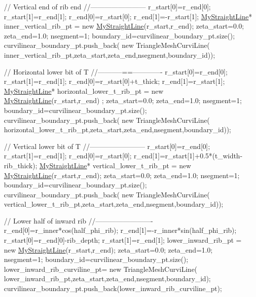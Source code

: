 \begin{DoxyCodeInclude}
  \textcolor{comment}{// Vertical end of rib end}
  \textcolor{comment}{//------------------------}
  r\_start[0]=r\_end[0];
  r\_start[1]=r\_end[1];
  r\_end[0]=r\_start[0];
  r\_end[1]=-r\_start[1];
  \hyperlink{classMyStraightLine}{MyStraightLine}* inner\_vertical\_rib\_pt = \textcolor{keyword}{new} \hyperlink{classMyStraightLine}{MyStraightLine}(r\_start,r\_end);
  zeta\_start=0.0;
  zeta\_end=1.0;
  nsegment=1;
  boundary\_id=curvilinear\_boundary\_pt.size();
  curvilinear\_boundary\_pt.push\_back(
   \textcolor{keyword}{new} TriangleMeshCurviLine(
    inner\_vertical\_rib\_pt,zeta\_start,zeta\_end,nsegment,boundary\_id));
 

  \textcolor{comment}{// Horizontal lower bit of T}
  \textcolor{comment}{//-----------==-------------}
  r\_start[0]=r\_end[0];
  r\_start[1]=r\_end[1];
  r\_end[0]=r\_start[0]+t\_thick;
  r\_end[1]=r\_start[1];
  \hyperlink{classMyStraightLine}{MyStraightLine}* horizontal\_lower\_t\_rib\_pt = \textcolor{keyword}{new} \hyperlink{classMyStraightLine}{MyStraightLine}(r\_start,r\_end)
      ;
  zeta\_start=0.0;
  zeta\_end=1.0;
  nsegment=1;
  boundary\_id=curvilinear\_boundary\_pt.size();
  curvilinear\_boundary\_pt.push\_back(
   \textcolor{keyword}{new} TriangleMeshCurviLine(
    horizontal\_lower\_t\_rib\_pt,zeta\_start,zeta\_end,nsegment,boundary\_id));


  \textcolor{comment}{// Vertical lower bit of T}
  \textcolor{comment}{//------------------------}
  r\_start[0]=r\_end[0];
  r\_start[1]=r\_end[1];
  r\_end[0]=r\_start[0];
  r\_end[1]=r\_start[1]+0.5*(t\_width-rib\_thick);
  \hyperlink{classMyStraightLine}{MyStraightLine}* vertical\_lower\_t\_rib\_pt = \textcolor{keyword}{new} \hyperlink{classMyStraightLine}{MyStraightLine}(r\_start,r\_end);
  zeta\_start=0.0;
  zeta\_end=1.0;
  nsegment=1;
  boundary\_id=curvilinear\_boundary\_pt.size();
  curvilinear\_boundary\_pt.push\_back(
   \textcolor{keyword}{new} TriangleMeshCurviLine(
    vertical\_lower\_t\_rib\_pt,zeta\_start,zeta\_end,nsegment,boundary\_id));


  \textcolor{comment}{// Lower half of inward rib}
  \textcolor{comment}{//-------------------------}
  r\_end[0]=r\_inner*cos(half\_phi\_rib);
  r\_end[1]=-r\_inner*sin(half\_phi\_rib);
  r\_start[0]=r\_end[0]-rib\_depth;
  r\_start[1]=r\_end[1];
  lower\_inward\_rib\_pt = \textcolor{keyword}{new} \hyperlink{classMyStraightLine}{MyStraightLine}(r\_start,r\_end);
  zeta\_start=0.0;
  zeta\_end=1.0;
  nsegment=1;
  boundary\_id=curvilinear\_boundary\_pt.size();
  lower\_inward\_rib\_curviline\_pt=
   \textcolor{keyword}{new} TriangleMeshCurviLine(
    lower\_inward\_rib\_pt,zeta\_start,zeta\_end,nsegment,boundary\_id);
  curvilinear\_boundary\_pt.push\_back(lower\_inward\_rib\_curviline\_pt);



\end{DoxyCodeInclude}

